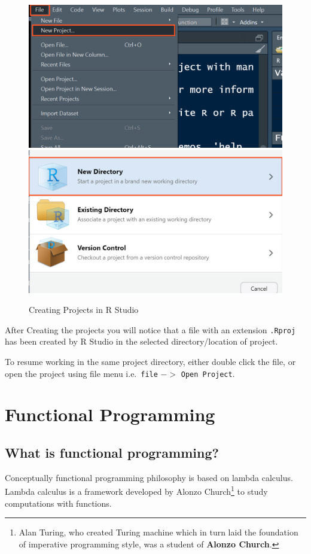 \documentclass[
]{book}
\begin{document}
\begin{figure}

{\centering \includegraphics[width=0.49\linewidth,height=0.49\textheight]{images/Rproj1} \includegraphics[width=0.49\linewidth,height=0.49\textheight]{images/Rproj2} 

}

\caption{Creating Projects in R Studio}\label{fig:unnamed-chunk-188}
\end{figure}

After Creating the projects you will notice that a file with an extension \texttt{.Rproj} has been created by R Studio in the selected directory/location of project.

To resume working in the same project directory, either double click the file, or open the project using file menu i.e.~\texttt{file} \(->\) \texttt{Open\ Project}.

\hypertarget{functional-programming}{%
\chapter{Functional Programming}\label{functional-programming}}

\hypertarget{what-is-functional-programming}{%
\section{What is functional programming?}\label{what-is-functional-programming}}

Conceptually functional programming philosophy is based on lambda calculus. Lambda calculus is a framework developed by Alonzo Church\footnote{Alan Turing, who created Turing machine which in turn laid the foundation of imperative programming style, was a student of \textbf{Alonzo Church}.} to study computations with functions.
\end{document}

